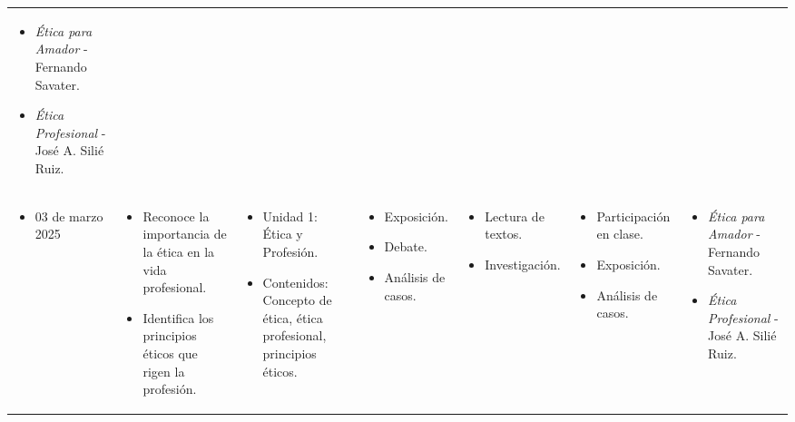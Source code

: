 \begin{landscape}
\begin{xltabular}{\linewidth}{@{}X@{}X@{}X@{}X@{}X@{}X@{}X@{}}
        \begin{itemize}
            \item \textit{Ética para Amador} - Fernando Savater.
            \item \textit{Ética Profesional} - José A. Silié Ruiz.
        \end{itemize}\\
        \begin{itemize}[label={}, left=0pt .. 0pt]
            \item 03 de marzo 2025
        \end{itemize}                                                          &
        \begin{itemize}
            \item Reconoce la importancia de la ética en la vida profesional.
            \item Identifica los principios éticos que rigen la profesión.
        \end{itemize}          &
        \begin{itemize}
            \item Unidad 1: Ética y Profesión.
            \item Contenidos: Concepto de ética, ética profesional, principios éticos.
        \end{itemize} &
        \begin{itemize}
            \item Exposición.
            \item Debate.
            \item Análisis de casos.
        \end{itemize}                             &
        \begin{itemize}
            \item Lectura de textos.
            \item Investigación.
        \end{itemize}                             &
        \begin{itemize}
            \item Participación en clase.
            \item Exposición.
            \item Análisis de casos.
        \end{itemize}                             &
        \begin{itemize}
            \item \textit{Ética para Amador} - Fernando Savater.
            \item \textit{Ética Profesional} - José A. Silié Ruiz.
        \end{itemize}\\
        \bottomrule
    \end{xltabular}
\end{landscape}